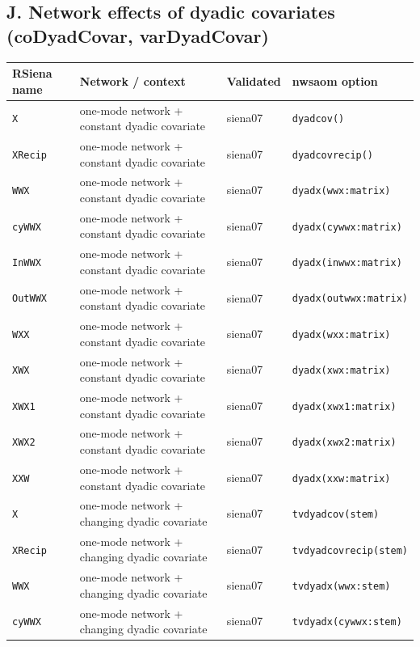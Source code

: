 \subsection*{J. Network effects of dyadic covariates (coDyadCovar, varDyadCovar)}
\footnotesize
\begin{longtable}{@{}p{2.6cm}p{3.2cm}p{2.9cm}p{5.4cm}@{}}
\toprule
RSiena name & Network / context & Validated & nwsaom option\\
\midrule
\endhead
\texttt{X} & one-mode network + constant dyadic covariate & siena07 & \texttt{dyadcov()}\\
\texttt{XRecip} & one-mode network + constant dyadic covariate & siena07 & \texttt{dyadcovrecip()}\\
\texttt{WWX} & one-mode network + constant dyadic covariate & siena07 & \texttt{dyadx(wwx:matrix)}\\
\texttt{cyWWX} & one-mode network + constant dyadic covariate & siena07 & \texttt{dyadx(cywwx:matrix)}\\
\texttt{InWWX} & one-mode network + constant dyadic covariate & siena07 & \texttt{dyadx(inwwx:matrix)}\\
\texttt{OutWWX} & one-mode network + constant dyadic covariate & siena07 & \texttt{dyadx(outwwx:matrix)}\\
\texttt{WXX} & one-mode network + constant dyadic covariate & siena07 & \texttt{dyadx(wxx:matrix)}\\
\texttt{XWX} & one-mode network + constant dyadic covariate & siena07 & \texttt{dyadx(xwx:matrix)}\\
\texttt{XWX1} & one-mode network + constant dyadic covariate & siena07 & \texttt{dyadx(xwx1:matrix)}\\
\texttt{XWX2} & one-mode network + constant dyadic covariate & siena07 & \texttt{dyadx(xwx2:matrix)}\\
\texttt{XXW} & one-mode network + constant dyadic covariate & siena07 & \texttt{dyadx(xxw:matrix)}\\
\texttt{X} & one-mode network + changing dyadic covariate & siena07 & \texttt{tvdyadcov(stem)}\\
\texttt{XRecip} & one-mode network + changing dyadic covariate & siena07 & \texttt{tvdyadcovrecip(stem)}\\
\texttt{WWX} & one-mode network + changing dyadic covariate & siena07 & \texttt{tvdyadx(wwx:stem)}\\
\texttt{cyWWX} & one-mode network + changing dyadic covariate & siena07 & \texttt{tvdyadx(cywwx:stem)}\\

\end{longtable}
